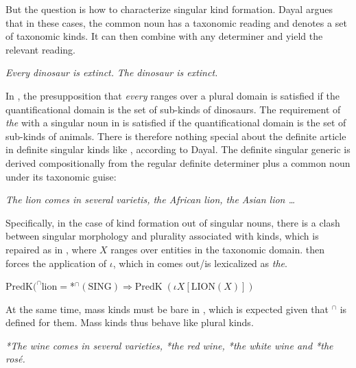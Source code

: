 \documentclass[output=paper,
modfonts
]{langscibook}
\begin{document}
	But the question is how to characterize singular kind formation. Dayal argues that in these cases, the common noun has a taxonomic reading and denotes a set of taxonomic kinds. It can then combine with any determiner and yield the relevant reading.
	
	\ea \label{ex:despic:40}
	\ea \label{ex:despic:40a}
	\textit{Every dinosaur is extinct.} 
	\ex \label{ex:despic:40b}
	\textit{The dinosaur is extinct.}
	\z
	\z 
	
	In , the presupposition that \textit{every} ranges over a plural domain is satisfied if the
	quantificational domain is the set of sub-kinds of dinosaurs. The  requirement of \textit{the} with a singular noun in  is satisfied if the quantificational domain is the set of sub-kinds of animals. There is therefore nothing special about the definite article in definite singular kinds like , according to Dayal. The definite singular generic is derived compositionally from the regular definite determiner plus a common noun under its taxonomic guise:
	
	\ea \label{ex:despic:41}
	\textit{The lion comes in several varietis, the African lion, the Asian lion \ldots}
	\z 
	
	Specifically, in the case of kind formation out of singular nouns, there is a clash between singular morphology and plurality associated with kinds, which is repaired as in , where $X$ ranges over entities in the taxonomic domain.  then forces the application of $\iota$, which in  comes out/is lexicalized as \textit{the}.
	
	\ea \label{ex:despic:42}
	$\textrm{PredK}(^\cap\textrm{lion}=$*$^\cap(\textrm{SING})\Rightarrow\textrm{PredK}\;(\iota X[\textrm{LION}(X)])$ \citep[435]{Dayal2004}
	\z 
	
	At the same time, mass kinds must be bare in  , which is expected given that $^\cap$ is defined for them. Mass kinds thus behave like plural kinds.
	
	\ea \label{ex:despic:43}
	\textit{{\op}\textnormal{*}The{\cp} wine comes in several varieties, {\op}\textnormal{*}the{\cp} red wine, {\op}\textnormal{*}the{\cp} white wine and {\op}\textnormal{*}the{\cp} ros\'e.}
	\z 
	
\end{document}
